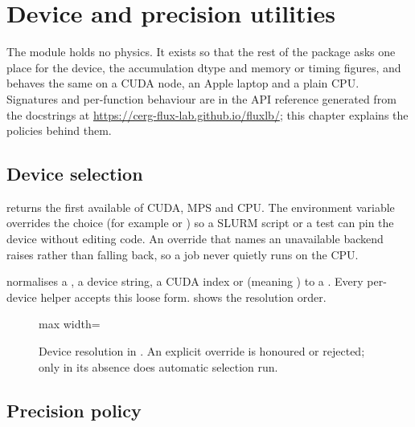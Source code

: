 
\chapter{Device and precision utilities}

\label{Chapter2}

The module  holds no physics. It exists so that the rest of the
package asks one place for the device, the accumulation dtype and memory or timing figures,
and behaves the same on a CUDA node, an Apple laptop and a plain CPU. Signatures and
per-function behaviour are in the API reference generated from the docstrings at
\url{https://cerg-flux-lab.github.io/fluxlb/}; this chapter explains the policies behind them.


\section{Device selection}

 returns the first available of CUDA, MPS and CPU. The environment
variable  overrides the choice (for example  or
) so a SLURM script or a test can pin the device without editing code. An
override that names an unavailable backend raises  rather than falling
back, so a job never quietly runs on the CPU.

 normalises a , a device string, a CUDA index
or  (meaning ) to a . Every per-device
helper accepts this loose form.  shows the resolution order.

\begin{figure}[h]
\centering
\begin{adjustbox}{max width=\linewidth}\end{adjustbox}
\caption{Device resolution in . An explicit override is honoured or
rejected; only in its absence does automatic selection run.}
\label{fig:device}
\end{figure}


\section{Precision policy}\label{sec:precision}

